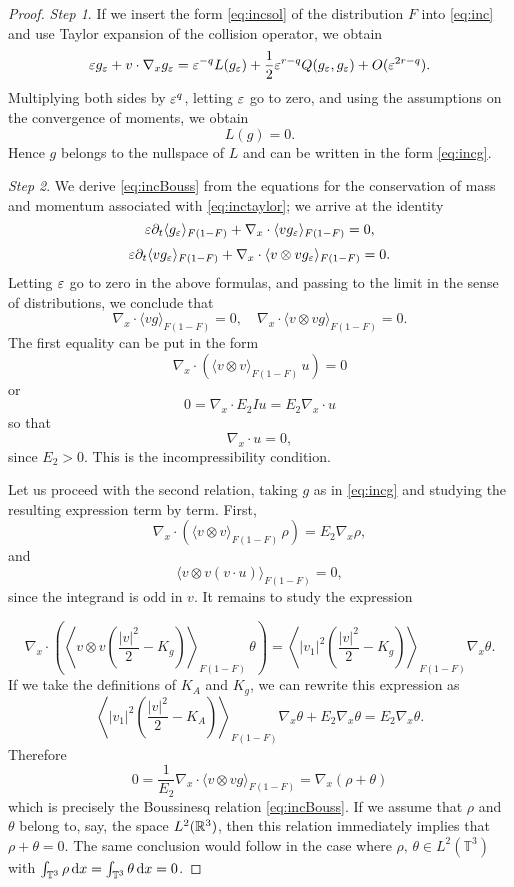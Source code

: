 \begin{proof}
  
 \textit{Step 1}. 
 If we insert the form  \eqref{eq:incsol} of the distribution $F$ into \eqref{eq:inc} and use Taylor expansion of the collision operator, we
obtain
\begin{equation}
 {\varepsilon} g_{\varepsilon} + v\cdot \nabla_xg_{\varepsilon} =
{\varepsilon}^{-q}L(g_{\varepsilon})+\frac 12
{\varepsilon}^{r-q}Q(g_{\varepsilon},g_{\varepsilon})+O({\varepsilon}^{2r-q}).\label{eq:inctaylor}
\end{equation}
Multiplying both sides  by ${\varepsilon}^{q}$, letting ${\varepsilon}$ go to zero, and using the assumptions on the 
 convergence of moments, we obtain
\[L(g)=0.\]
Hence $g$ belongs to the nullspace of $L$ and can be written in the form \eqref{eq:incg}.

\textit{Step 2}. 
We derive \eqref{eq:incBouss} from the equations for the conservation of mass and momentum associated
with \eqref{eq:inctaylor}; we arrive at the identity
\[
{\varepsilon}\partial_t\langle g_{\varepsilon}\rangle_{F(1-F)}+\nabla_x\cdot\langle
vg_{\varepsilon}\rangle_{F(1-F)}= 0, \]\[
{\varepsilon}\partial_t\langle vg_{\varepsilon}\rangle_{F(1-F)}+\nabla_x\cdot\langle
v\otimes vg_{\varepsilon}\rangle_{F(1-F)}= 0.  
\]
Letting ${\varepsilon}$ go to zero in the above formulas, and passing to the limit in
the sense of distributions, we conclude that
\[ \nabla_x\cdot\langle vg \rangle_{F(1-F)}= 0,\quad \nabla_x\cdot\langle
v\otimes vg \rangle_{F(1-F)}= 0.\]
The first equality can be put in the form
\[\nabla_x\cdot\left(\langle v\otimes v \rangle_{F(1-F)}\,u\right)=0\]
or
\[0=\nabla_x\cdot E_2Iu=E_2\nabla_x\cdot u\]
so that
\[\nabla_x\cdot u=0,\]
since $E_2>0$. This is the incompressibility condition.

Let us proceed with the second relation, taking $g$ as in \eqref{eq:incg} and studying the
resulting expression term by term. First,
\[\nabla_x\cdot\left(\langle v\otimes v
\rangle_{F(1-F)}\,\rho\right)=E_2\nabla_x  \rho,\]
and
\[\langle v\otimes v (v\cdot u)\rangle_{F(1-F)}=0,\]
since the integrand is odd in $v$.
 It remains  to study the expression

\[\nabla_x\cdot\left(\left\langle v\otimes v \left(\frac{|v|^2}{2}-K_g\right)
\right\rangle_{F(1-F)}\, \theta\right)=   \left\langle |v_1|^2
\left(\frac{|v|^2}{2}-K_g\right) \right\rangle_{F(1-F)}\nabla_x\theta  .\]
If we take the  definitions of $K_A$ and $K_g$, we can rewrite this expression
as
\[\left\langle |v_1|^2 \left(\frac{|v|^2}{2}-K_A\right)
\right\rangle_{F(1-F)}\nabla_x\theta +E_2\nabla_x  \theta   = E_2\nabla_x\theta
.\]
Therefore  
\[0=\frac{1}{E_2}\nabla_x\cdot\langle v\otimes vg \rangle_{F(1-F)} = 
\nabla_x(\rho+\theta)\]
which is precisely the Boussinesq relation \eqref{eq:incBouss}.
If we assume that $\rho$ and $\theta$ belong to, say, the space $L^2({\mathbb {R}^3})$, then this relation immediately implies that $\rho+\theta
=0$. The same conclusion would follow in the case where $\rho,\,\theta\in L^2(\mathbb T^3)$ with $\int_{\mathbb T^3}\rho {\,\mathrm{d} x} = \int_{\mathbb T^3}\theta {\,\mathrm{d} x}=0$.%


\end{proof}
